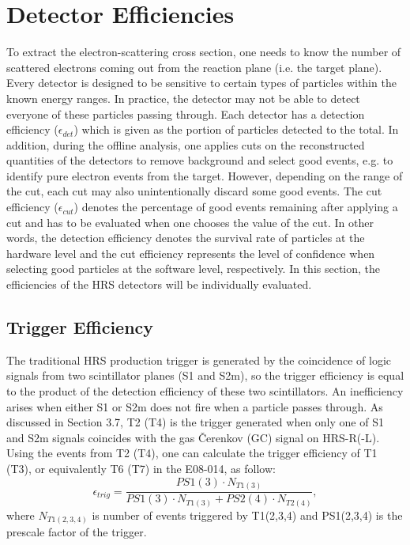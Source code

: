 \section{Detector Efficiencies}
  To extract the electron-scattering cross section, one needs to know the number of scattered electrons coming out from the reaction plane (i.e. the target plane). Every detector is designed to be sensitive to certain types of particles within the known energy ranges. In practice, the detector may not be able to detect everyone of these particles passing through. Each detector has a detection efficiency ($\epsilon_{det}$) which is given as the portion of particles detected to the total. In addition, during the offline analysis, one applies cuts on the reconstructed quantities of the detectors to remove background and select good events, e.g. to identify pure electron events from the target. However, depending on the range of the cut, each cut may also unintentionally discard some good events. The cut efficiency ($\epsilon_{cut}$) denotes the percentage of good events remaining after applying a cut and has to be evaluated when one chooses the value of the cut. In other words, the detection efficiency denotes the survival rate of particles at the hardware level and the cut efficiency represents the level of confidence when selecting good particles at the software level, respectively. In this section, the efficiencies of the HRS detectors will be individually evaluated.

\subsection{Trigger Efficiency}
 The traditional HRS production trigger is generated by the coincidence of logic signals from two scintillator planes (S1 and S2m), so the trigger efficiency is equal to the product of the detection efficiency of these two scintillators. An inefficiency arises when either S1 or S2m does not fire when a particle passes through. As discussed in Section 3.7, T2 (T4) is the trigger generated when only one of S1 and S2m signals coincides with the gas \v{C}erenkov (GC) signal on HRS-R(-L). Using the events from T2 (T4), one can calculate the trigger efficiency of T1 (T3), or equivalently T6 (T7) in the E08-014, as follow: 
\begin{equation}
  \epsilon_{trig} = \frac{PS1(3)\cdot N_{T1(3)}}{PS1(3) \cdot N_{T1(3)}+PS2(4)\cdot N_{T2(4)}},
  \label{trigger_eff}
\end{equation}
where $N_{T1(2,3,4)}$ is number of events triggered by T1(2,3,4) and PS1(2,3,4) is the prescale factor of the trigger.

